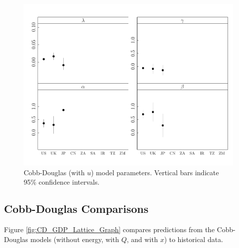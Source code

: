\documentclass[preprint,authoryear,12pt]{elsarticle}\usepackage{graphicx, color}
\makeatletter
\def\maxwidth{ %
  \ifdim\Gin@nat@width>\linewidth
    \linewidth
  \else
    \Gin@nat@width
  \fi
}
\newenvironment{knitrout}{}{} %
\makeatother
\begin{document}
\begin{knitrout}
\color{fgcolor}\begin{figure}[]

\includegraphics[width=\maxwidth]{figure/CDu_Params_Graph} \caption[Cobb-Douglas (with $u$) model parameters]{Cobb-Douglas (with $u$) model parameters. Vertical bars indicate 95\% confidence intervals.\label{fig:CDu_Params_Graph}}
\end{figure}


\end{knitrout}


\subsection{Cobb-Douglas Comparisons}

Figure \ref{fig:CD_GDP_Lattice_Graph} compares predictions from the Cobb-Douglas models (without energy, with $Q$, and with $x$) to historical data.
\end{document}
